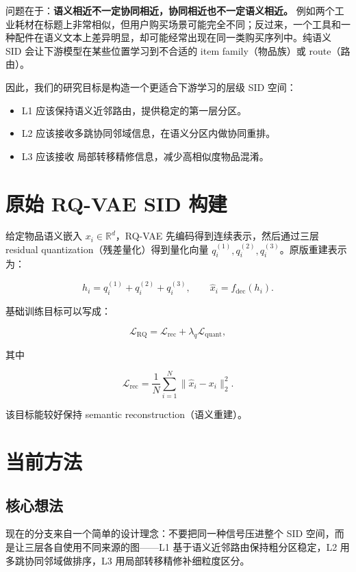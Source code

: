 \documentclass[11pt]{article}
\begin{document}
问题在于：\textbf{语义相近不一定协同相近，协同相近也不一定语义相近。} 例如两个工业耗材在标题上非常相似，但用户购买场景可能完全不同；反过来，一个工具和一种配件在语义文本上差异明显，却可能经常出现在同一类购买序列中。纯语义 SID 会让下游模型在某些位置学习到不合适的 item family（物品族）或 route（路由）。

因此，我们的研究目标是构造一个更适合下游学习的层级 SID 空间：

\begin{itemize}
  \item L1 应该保持语义近邻路由，提供稳定的第一层分区。
  \item L2 应该接收多跳协同邻域信息，在语义分区内做协同重排。
  \item L3 应该接收 局部转移精修信息，减少高相似度物品混淆。
\end{itemize}

\section{原始 RQ-VAE SID 构建}

给定物品语义嵌入 $x_i \in \mathbb{R}^d$，RQ-VAE 先编码得到连续表示，然后通过三层 residual quantization（残差量化）得到量化向量 $q_i^{(1)},q_i^{(2)},q_i^{(3)}$。原版重建表示为：

\[
h_i = q_i^{(1)} + q_i^{(2)} + q_i^{(3)}, \qquad \hat{x}_i = f_{\mathrm{dec}}(h_i).
\]

基础训练目标可以写成：

\[
\mathcal{L}_{\mathrm{RQ}} =
\mathcal{L}_{\mathrm{rec}}
+ \lambda_q \mathcal{L}_{\mathrm{quant}},
\]

其中

\[
\mathcal{L}_{\mathrm{rec}}
= \frac{1}{N}\sum_{i=1}^{N}\lVert \hat{x}_i-x_i\rVert_2^2.
\]

该目标能较好保持 semantic reconstruction（语义重建）。

\section{当前方法}

\subsection{核心想法}

现在的分支来自一个简单的设计理念：不要把同一种信号压进整个 SID 空间，而是让三层各自使用不同来源的图——L1 基于语义近邻路由保持粗分区稳定，L2 用多跳协同邻域做排序，L3 用局部转移精修补细粒度区分。
\end{document}
